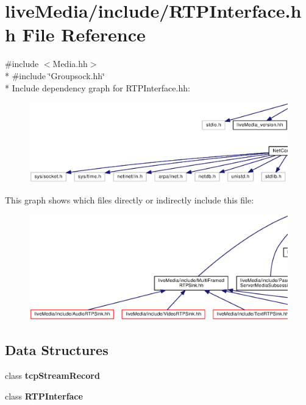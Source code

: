 \section{live\+Media/include/\+R\+T\+P\+Interface.hh File Reference}
\label{RTPInterface_8hh}
{\ttfamily \#include $<$Media.\+hh$>$}\\*
{\ttfamily \#include \char`\"{}Groupsock.\+hh\char`\"{}}\\*
Include dependency graph for R\+T\+P\+Interface.\+hh\+:
\nopagebreak
\begin{figure}[H]
\begin{center}
\leavevmode
\includegraphics[width=350pt]{RTPInterface_8hh__incl}
\end{center}
\end{figure}
This graph shows which files directly or indirectly include this file\+:
\nopagebreak
\begin{figure}[H]
\begin{center}
\leavevmode
\includegraphics[width=350pt]{RTPInterface_8hh__dep__incl}
\end{center}
\end{figure}
\subsection*{Data Structures}
\begin{DoxyCompactItemize}
\item 
class {\bf tcp\+Stream\+Record}
\item 
class {\bf R\+T\+P\+Interface}
\end{DoxyCompactItemize}
